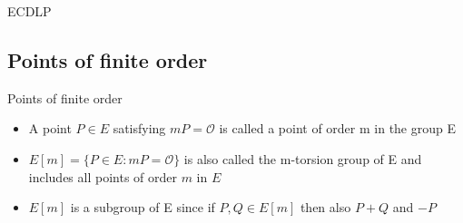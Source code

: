 \documentclass{beamer}
\begin{document}
\begin{frame}{ECDLP}
\end{frame}

\subsection{Points of finite order} 

\begin{frame}{Points of finite order}
\begin{itemize}[\textbullet]
	\item A point $P\in E$ satisfying $mP=\mathcal{O}$ is called a point of order m in the group E
	\item $E[m] = \{P\in E: mP = \mathcal{O}\}$ is also called the m-torsion group of E and includes all points of order $m$ in $E$
	\item $E[m] $ is a subgroup of E since if $P,Q\in E[m]$ then also $P+Q$ and $-P$
\end{itemize}
 	
\end{frame}
\end{document}
